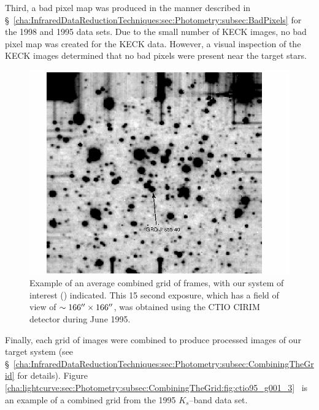 Third, a bad pixel map was produced in the manner described in \S~\ref{cha:InfraredDataReductionTechniques:sec:Photometry:subsec:BadPixels} for the 1998 and 1995 data sets. Due to the small number of KECK images, no bad pixel map was created
for the KECK data. However, a visual inspection of the KECK images
determined that no bad pixels were present near the target stars. %

\vspace{\myparskip}

\begin{figure}[!htb]
\begin{center}
\includegraphics[width=5.0in]{ctio95_g001_3}
\caption{%
Example of an average combined grid of frames, with our system of interest
(\mbox{\groj}) indicated. This 15 second exposure, which has a
field of view of $\sim 166\hbox{$^{\prime\prime}$} \times 166\hbox{$^{\prime\prime}$} $, was
obtained using the CTIO CIRIM detector during June 1995.}
\label{cha:lightcurve:sec:Photometry:subsec:CombiningTheGrid:fig:ctio95_g001_3}
\end{center}
\end{figure}

Finally, each grid of images were combined to produce processed images of our target system (see \S~\vref{cha:InfraredDataReductionTechniques:sec:Photometry:subsec:CombiningTheGrid} for details). Figure~%
\vref{cha:lightcurve:sec:Photometry:subsec:CombiningTheGrid:fig:ctio95_g001_3}%
\ is an example of a combined grid from the 1995 $K_s$--band data set. %



